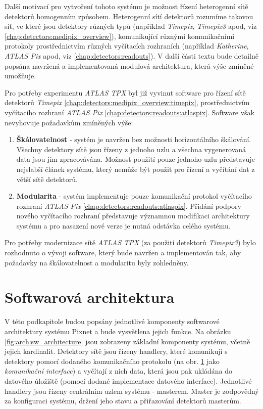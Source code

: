  Další motivací pro vytvoření tohoto systému je možnost řízení heterogenní sítě detektorů homogenním způsobem. Heterogenní sítí detektorů rozumíme takovou síť, ve které jsou detektory různých typů (například \textit{Timepix}, \textit{Timepix3} apod, viz \ref{chap:detectors:medipix_overview}), komunikující různými komunikačními protokoly prostřednictvím různých vyčítacích rozhraních (například \textit{Katherine}, \textit{ATLAS Pix} apod, viz \ref{chap:detectors:readouts}). V další části textu bude detailně popsána navržená a implementovaná modulová architektura, která výše zmíněné umožňuje.

 Pro potřeby experimentu \textit{ATLAS TPX} byl již vyvinut software \cite{atlastpx_sw,BegeraBcThesis2016} pro řízení sítě detektorů \textit{Timepix} \ref{chap:detectors:medipix_overview:timepix}, prostřednictvím vyčítacího rozhraní \textit{ATLAS Pix} \ref{chap:detectors:readouts:atlaspix}. Software však nevyhovuje požadavkům zmíněných výše:
 \begin{enumerate}[label=(\roman*)]
     \item \textbf{Škálovatelnost} - systém je navržen bez možnosti horizontálního škálování. Všechny detektory sítě jsou řízeny z jednoho uzlu a všechna vygenerovaná data jsou jím zpracovávána. Možnost použití pouze jednoho uzlu představuje nejslabší článek systému, který nemůže být použit pro řízení a vyčítání dat z větší sítě detektorů.
     \item \textbf{Modularita} - systém implementuje pouze komunikační protokol vyčítacího rozhraní \textit{ATLAS Pix} \ref{chap:detectors:readouts:atlaspix}. Přidání podpory nového vyčítacího rozhraní představuje významnou modifikaci architektury systému a pro nasazení nové verze je nutná odstávka celého systému.
 \end{enumerate}
Pro potřeby modernizace sítě \textit{ATLAS TPX} (za použití detektorů \textit{Timepix3}) bylo rozhodnuto o vývoji software, který bude navržen a implementován tak, aby požadavky na škálovatelnost a modularitu byly zohledněny.

\section{Softwarová architektura}\label{chap:arch:sw}
V této podkapitole budou popsány jednotlivé komponenty softwarové architektury systému Pixnet a bude vysvětlena jejich funkce. Na obrázku \ref{fig:arch:sw_architecture} jsou zobrazeny základní komponenty systému, včetně jejich kardinalit. Detektory sítě jsou řízeny handlery, které komunikují s detektory pomocí dodaného komunikačního protokolu (na obr. \ref{chap:arch:sw} jako \textit{komunikační interface}) a vyčítají z nich data, která jsou pak ukládána do datového úložiště (pomocí dodané implementace datového interface). Jednotlivé handlery jsou řízeny centrálním uzlem systému - masterem. Master je zodpovědný za konfiguraci systému, držení jeho stavu a přiřazování detektorů masterům.

